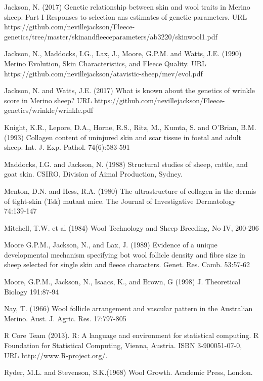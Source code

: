 \documentclass[titlepage]{article}  %
\begin{document}
\begin{thebibliography}{99}
Jackson, N. (2017) Genetic relationship between skin and wool traits in Merino sheep. Part I Responses to selection ans estimates of genetic parameters. URL https://github.com/nevillejackson/Fleece-genetics/tree/master/skinandfleeceparameters/ab3220/skinwool1.pdf

Jackson, N., Maddocks, I.G., Lax, J., Moore, G.P.M. and Watts, J.E. (1990) Merino Evolution, Skin Characteristics, and Fleece Quality. URL https://github.com/nevillejackson/atavistic-sheep/mev/evol.pdf 

Jackson, N. and Watts, J.E. (2017) What is known about the genetics of wrinkle score in Merino sheep? URL https://github.com/nevillejackson/Fleece-genetics/wrinkle/wrinkle.pdf

Knight, K.R., Lepore, D.A., Horne, R.S., Ritz, M., Kumta, S. and O'Brian, B.M. (1993) Collagen content of uninjured skin and scar tissue in foetal and adult sheep. Int. J. Exp. Pathol. 74(6):583-591

Maddocks, I.G. and Jackson, N. (1988) Structural studies of sheep, cattle, and goat skin. CSIRO, Division of Aimal Production, Sydney.

Menton, D.N. and Hess, R.A. (1980) The ultrastructure of collagen in the dermis of tight-skin (Tsk) mutant mice. The Journal of Investigative Dermatology 74:139-147

Mitchell, T.W. et al (1984) Wool Technology and Sheep Breeding, No IV, 200-206

Moore G.P.M., Jackson, N., and Lax, J. (1989) Evidence of a unique developmental mechanism specifying bot wool follicle density and fibre size in sheep selected for single skin and fleece characters. Genet. Res. Camb. 53:57-62

Moore, G.P.M., Jackson, N., Isaacs, K., and Brown, G (1998) J. Theoretical Biology 191:87-94

Nay, T. (1966) Wool follicle arrangement and vascular pattern in the Australian Merino. Aust. J. Agric. Res. 17:797-805

R Core Team (2013). R: A language and environment for statistical
  computing. R Foundation for Statistical Computing, Vienna, Austria.
  ISBN 3-900051-07-0, URL http://www.R-project.org/.

Ryder, M.L. and Stevenson, S.K.(1968) Wool Growth. Academic Press, London.



\end{thebibliography}
\end{document}
